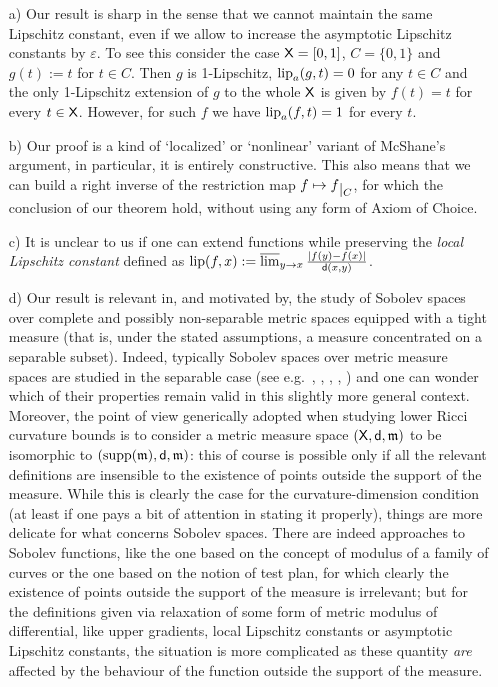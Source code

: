 \documentclass[9pt,reqno]{amsart}
\newcommand{\sfd}{{\sf d}}
\newcommand{\X}{{\sf X}}
\newcommand{\lims}{\varlimsup}
\def\lipa#1#2{{\rm lip}_a (#1,#2)}
\def\ep{\varepsilon}
\newcommand{\restr}[1]{\lower3pt\hbox{$|_{#1}$}} %
\begin{document}
\begin{itemize}
\item[a)] Our result is sharp in the sense that we cannot maintain the same Lipschitz constant, even if we allow to increase the asymptotic Lipschitz constants by $\ep$. To see this consider the case $\X=[0,1]$, $C=\{0,1\}$ and $g(t):=t$ for $t\in C$. Then $g$ is 1-Lipschitz, $\lipa{g}{t}=0$ for any $t\in C$ and the only 1-Lipschitz extension of $g$ to the whole $\X$ is given by $f(t)=t$ for every $t\in\X$. However, for such $f$ we have $\lipa{f}{t}=1$ for every $t$.
\item[b)] Our proof is a kind of `localized' or `nonlinear' variant of McShane's argument, in particular, it is entirely constructive. This also means that we can build a right inverse of the restriction map $f\mapsto f\restr C$, for which the conclusion of our theorem hold, without using any form of Axiom of Choice.
\item[c)] It is unclear to us if one can extend functions while preserving the \emph{local Lipschitz constant} defined as ${\rm lip}(f,x):=\lims_{y\to x}\frac{|f(y)-f(x)|}{\sfd(x,y)}$.
\item[d)] Our result is relevant in, and motivated by, the study of Sobolev spaces over complete and possibly non-separable metric spaces equipped with a tight measure (that is, under the stated assumptions, a measure concentrated on a separable subset). Indeed, typically Sobolev spaces over metric measure spaces are studied in the separable case (see e.g.\ \cite{Cheeger00}, \cite{Shanmugalingam00}, \cite{HKST15}, \cite{AmbrosioGigliSavare11}, \cite{Bjorn-Bjorn11}) and one can wonder which of their properties remain valid in this slightly more general context. Moreover, the point of view generically adopted when studying lower Ricci curvature bounds is to consider a metric measure space $(\X,\sfd,\mathfrak m)$ to be isomorphic to $({\rm supp}(\mathfrak m),\sfd,\mathfrak m)$: this of course is possible only if all the relevant definitions are insensible to the existence of points outside the support of the measure. While this is clearly the case for the curvature-dimension condition (at least if one pays a bit of attention in stating it properly), things are more delicate for what concerns Sobolev spaces. There are indeed approaches to Sobolev functions, like the one based on the concept of modulus of a family of curves or the one based on the notion of test plan, for which clearly the existence of points outside the support of the measure is irrelevant; but for the definitions given via relaxation of some form of metric modulus of differential, like upper gradients, local Lipschitz constants or asymptotic Lipschitz constants, the situation is more complicated as these quantity \emph{are} affected by the behaviour of the function outside the support of the measure. 


\end{itemize}
\end{document}
